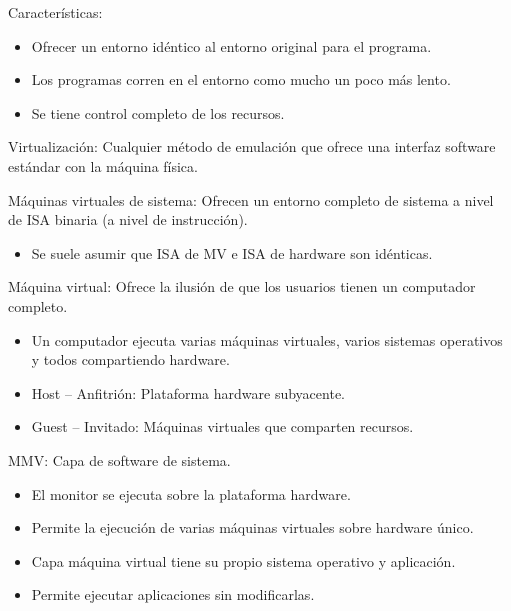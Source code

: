 \documentclass[12pt, twoside, openright]{report} %
\begin{document}
Características:
\vspace{-0.5cm}

\begin{itemize}

	\item Ofrecer un entorno idéntico al entorno original para el programa.
	\item Los programas corren en el entorno como mucho un poco más lento.
	\item Se tiene control completo de los recursos.
\end{itemize}

Virtualización: Cualquier método de emulación que ofrece una
interfaz software estándar con la máquina física.

Máquinas virtuales de sistema: Ofrecen un entorno completo de
sistema a nivel de ISA binaria (a nivel de instrucción).

\begin{itemize}

	\item Se suele asumir que ISA de MV e ISA de hardware son idénticas.
\end{itemize}

Máquina virtual: Ofrece la ilusión de que los usuarios tienen un
computador completo.
\vspace{-0.5cm}

\begin{itemize}

	\item Un computador ejecuta varias máquinas virtuales, varios sistemas
	      operativos y todos compartiendo hardware.
	\item Host -- Anfitrión: Plataforma hardware subyacente.
	\item Guest -- Invitado: Máquinas virtuales que comparten recursos.
\end{itemize}

MMV: Capa de software de sistema.
\vspace{-0.5cm}
\begin{itemize}

	\item El monitor se ejecuta sobre la plataforma hardware.
	\item Permite la ejecución de varias máquinas virtuales sobre hardware
	      único.
	\item Capa máquina virtual tiene su propio sistema operativo y
	      aplicación.
	\item Permite ejecutar aplicaciones sin modificarlas.
\end{itemize}
\end{document}
